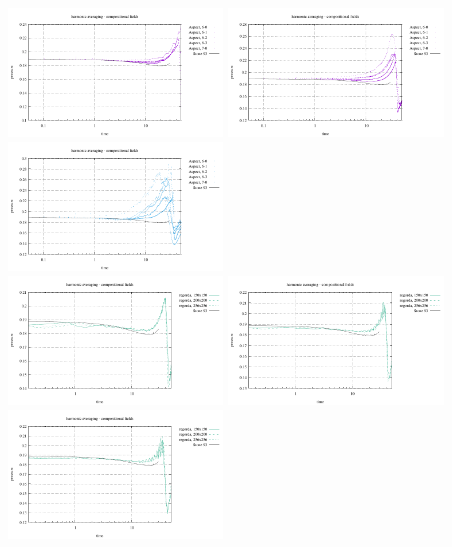 \begin{center}
\includegraphics[width=5.7cm]{images/stokes_sphere_fs2D/point_p_arithm_comp}
\includegraphics[width=5.7cm]{images/stokes_sphere_fs2D/point_p_geom_comp}
\includegraphics[width=5.7cm]{images/stokes_sphere_fs2D/point_p_harm_comp}\\
\includegraphics[width=5.7cm]{images/stokes_sphere_fs2D/point_p_arithm_pic}
\includegraphics[width=5.7cm]{images/stokes_sphere_fs2D/point_p_geom_pic}
\includegraphics[width=5.7cm]{images/stokes_sphere_fs2D/point_p_harm_pic}
\end{center}

